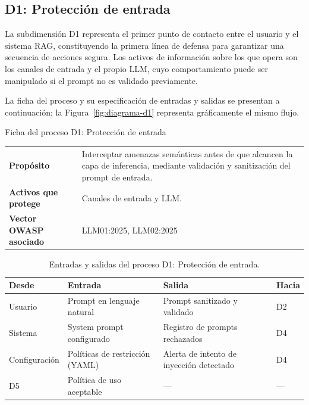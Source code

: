 \subsection{D1: Protección de entrada}

La subdimensión D1 representa el primer punto de contacto entre el usuario y el sistema RAG, constituyendo la primera línea de defensa para garantizar una secuencia de acciones segura. Los activos de información sobre los que opera son los canales de entrada y el propio LLM, cuyo comportamiento puede ser manipulado si el prompt no es validado previamente.

La ficha del proceso y su especificación de entradas y salidas se presentan a continuación; la Figura~\ref{fig:diagrama-d1} representa gráficamente el mismo flujo.

\begin{fichabox}{Ficha del proceso D1: Protección de entrada}
  \begin{tabularx}{\textwidth}{@{} l X @{}}
    \textbf{Propósito} &
      Interceptar amenazas semánticas antes de que alcancen la capa
      de inferencia, mediante validación y sanitización del prompt
      de entrada. \\[4pt]
    \textbf{Activos que protege} &
      Canales de entrada y LLM. \\[4pt]
    \textbf{Vector OWASP asociado} &
      LLM01:2025, LLM02:2025 \\
  \end{tabularx}
\end{fichabox}

\begin{table}[H]
  \centering
  \caption{Entradas y salidas del proceso D1: Protección de entrada.}
  \label{tab:es-d1}
  \begin{tabularx}{\textwidth}{@{} l l X l @{}}
    \toprule
    \textbf{Desde} & \textbf{Entrada} &
    \textbf{Salida} & \textbf{Hacia} \\
    \midrule
    Usuario &
      Prompt en lenguaje natural &
      Prompt sanitizado y validado &
      D2 \\
    Sistema &
      System prompt configurado &
      Registro de prompts rechazados &
      D4 \\
    Configuración &
      Políticas de restricción (YAML) &
      Alerta de intento de inyección detectado &
      D4 \\
    D5 &
      Política de uso aceptable &
      --- &
      --- \\
    \bottomrule
  \end{tabularx}
\end{table}

